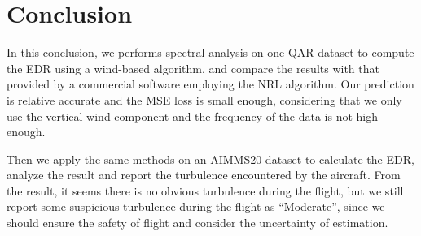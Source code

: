 \documentclass[runningheads]{llncs}
\begin{document}






\section{Conclusion}

In this conclusion, we performs spectral analysis on one QAR dataset to compute the EDR using a wind-based algorithm, and compare the results with that provided by a commercial software employing the NRL algorithm. 
Our prediction is relative accurate and the MSE loss is small enough, considering that we only use the vertical wind component and the frequency of the data is not high enough.

Then we apply the same methods on an AIMMS20 dataset to calculate the EDR, analyze the result and report the turbulence encountered by the aircraft. 
From the result, it seems there is no obvious turbulence during the flight, but we still report some suspicious turbulence during the flight as “Moderate”, since we should ensure the safety of flight and consider the uncertainty of estimation.
\end{document}
